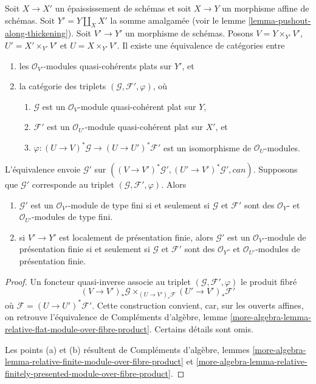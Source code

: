 \begin{lemma}
\label{lemma-scheme-over-pushout-flat-modules}
Soit $X \to X'$ un épaississement de schémas et soit $X \to Y$ un
morphisme affine de schémas. Soit $Y' = Y \amalg_X X'$ la somme amalgamée
(voir le lemme \ref{lemma-pushout-along-thickening}). Soit $V' \to Y'$
un morphisme de schémas. Posons
$V = Y \times_{Y'} V'$, $U' = X' \times_{Y'} V'$ et $U = X \times_{Y'} V'$.
Il existe une équivalence de catégories entre
\begin{enumerate}
\item les $\mathcal{O}_{V'}$-modules quasi-cohérents plats sur $Y'$, et
\item la catégorie des triplets $(\mathcal{G}, \mathcal{F}', \varphi)$, où
\begin{enumerate}
\item $\mathcal{G}$ est un $\mathcal{O}_V$-module quasi-cohérent plat sur $Y$,
\item $\mathcal{F}'$ est un $\mathcal{O}_{U'}$-module quasi-cohérent plat
sur $X'$, et
\item $\varphi : (U \to V)^*\mathcal{G} \to (U \to U')^*\mathcal{F}'$
est un isomorphisme de $\mathcal{O}_U$-modules.
\end{enumerate}
\end{enumerate}
L'équivalence envoie $\mathcal{G}'$ sur
$((V \to V')^*\mathcal{G}', (U' \to V')^*\mathcal{G}', can)$.
Supposons que $\mathcal{G}'$ corresponde au triplet
$(\mathcal{G}, \mathcal{F}', \varphi)$. Alors
\begin{enumerate}
\item[(a)] $\mathcal{G}'$ est un $\mathcal{O}_{V'}$-module de type fini si et
seulement si $\mathcal{G}$ et $\mathcal{F}'$ sont des
$\mathcal{O}_Y$- et $\mathcal{O}_{U'}$-modules de type fini.
\item[(b)] si $V' \to Y'$ est localement de présentation finie, alors
$\mathcal{G}'$ est un $\mathcal{O}_{V'}$-module de
présentation finie si et seulement si $\mathcal{G}$ et $\mathcal{F}'$ sont des
$\mathcal{O}_Y$- et $\mathcal{O}_{U'}$-modules de présentation finie.
\end{enumerate}
\end{lemma}

\begin{proof}
Un foncteur quasi-inverse associe au triplet
$(\mathcal{G}, \mathcal{F}', \varphi)$ le produit fibré
$$
(V \to V')_*\mathcal{G}
\times_{(U \to V')_*\mathcal{F}}
(U' \to V')_*\mathcal{F}'
$$
où $\mathcal{F} = (U \to U')^*\mathcal{F}'$. Cette construction convient, car,
sur les ouverts affines, on retrouve l'équivalence de Compléments d'algèbre, lemme
\ref{more-algebra-lemma-relative-flat-module-over-fibre-product}.
Certains détails sont omis.

\medskip\noindent
Les points (a) et (b) résultent de
Compléments d'algèbre, lemmes
\ref{more-algebra-lemma-relative-finite-module-over-fibre-product} et
\ref{more-algebra-lemma-relative-finitely-presented-module-over-fibre-product}.
\end{proof}

